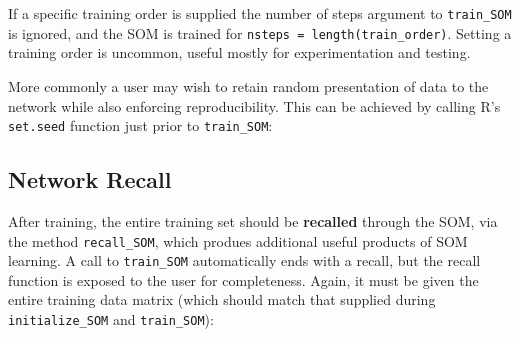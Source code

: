 \documentclass[]{article}
\newenvironment{Shaded}{\begin{snugshade}}{\end{snugshade}}
\newcommand{\CommentTok}[1]{\textcolor[rgb]{0.56,0.35,0.01}{\textit{#1}}}
\newcommand{\DecValTok}[1]{\textcolor[rgb]{0.00,0.00,0.81}{#1}}
\newcommand{\KeywordTok}[1]{\textcolor[rgb]{0.13,0.29,0.53}{\textbf{#1}}}
\newcommand{\NormalTok}[1]{#1}
\newcommand{\OperatorTok}[1]{\textcolor[rgb]{0.81,0.36,0.00}{\textbf{#1}}}
\begin{document}
If a specific training order is supplied the number of steps argument to \texttt{train\_SOM} is ignored, and the SOM is trained for \texttt{nsteps\ =\ length(train\_order)}. Setting a training order is uncommon, useful mostly for experimentation and testing.

More commonly a user may wish to retain random presentation of data to the network while also enforcing reproducibility. This can be achieved by calling R's \texttt{set.seed} function just prior to \texttt{train\_SOM}:

\begin{Shaded}
\end{Shaded}

\hypertarget{secRecall}{%
\subsection{Network Recall}\label{secRecall}}

After training, the entire training set should be \textbf{recalled} through the SOM, via the method \texttt{recall\_SOM}, which produes additional useful products of SOM learning. A call to \texttt{train\_SOM} automatically ends with a recall, but the recall function is exposed to the user for completeness. Again, it must be given the entire training data matrix (which should match that supplied during \texttt{initialize\_SOM} and \texttt{train\_SOM}):

\begin{Shaded}
\end{Shaded}
\end{document}

